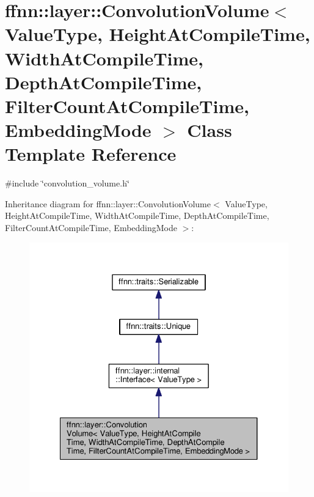 \hypertarget{classffnn_1_1layer_1_1_convolution_volume}{\section{ffnn\-:\-:layer\-:\-:Convolution\-Volume$<$ Value\-Type, Height\-At\-Compile\-Time, Width\-At\-Compile\-Time, Depth\-At\-Compile\-Time, Filter\-Count\-At\-Compile\-Time, Embedding\-Mode $>$ Class Template Reference}
\label{classffnn_1_1layer_1_1_convolution_volume}
}


{\ttfamily \#include \char`\"{}convolution\-\_\-volume.\-h\char`\"{}}



Inheritance diagram for ffnn\-:\-:layer\-:\-:Convolution\-Volume$<$ Value\-Type, Height\-At\-Compile\-Time, Width\-At\-Compile\-Time, Depth\-At\-Compile\-Time, Filter\-Count\-At\-Compile\-Time, Embedding\-Mode $>$\-:
\nopagebreak
\begin{figure}[H]
\begin{center}
\leavevmode
\includegraphics[width=326pt]{classffnn_1_1layer_1_1_convolution_volume__inherit__graph}
\end{center}
\end{figure}


